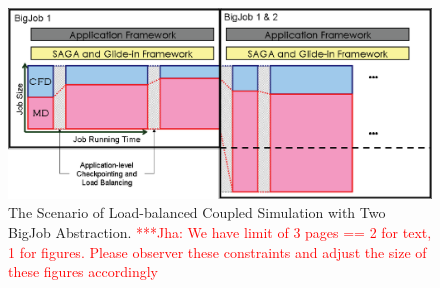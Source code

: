 \documentclass[a4paper]{article}
\newcommand{\jhanote}[1]{ {\textcolor{red} { ***Jha: #1 }}}
\newcommand{\jhanote}[1]{}
\begin{document}
\begin{figure}
\centering
\includegraphics [scale=0.33, angle=270]{Image3}
\caption{The Scenario of Load-balanced Coupled Simulation with Two BigJob Abstraction.\jhanote{We have limit of 3 pages == 2 for text, 1 for figures. Please observer these constraints and adjust the size of these figures accordingly}}
\end{figure}

\noindent 
\end{document}
